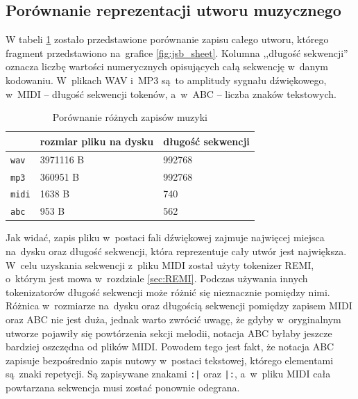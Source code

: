 \documentclass[data-science]{agh-wi} %
\begin{document}
\subsection{Porównanie reprezentacji utworu muzycznego}
W tabeli \ref*{tab:music_diff} zostało przedstawione porównanie zapisu całego utworu, którego fragment przedstawiono na~grafice \ref*{fig:jsb_sheet}. Kolumna ,,długość sekwencji'' oznacza liczbę wartości numerycznych opisujących całą sekwencję w~danym kodowaniu. W~plikach WAV i~MP3 są~to amplitudy sygnału dźwiękowego, w~MIDI -- długość sekwencji tokenów, a~w~ABC -- liczba znaków tekstowych.

\begin{table}[ht!]
    \centering
    \begin{tabular}{|l|l|l|}
        \hline
                      & rozmiar pliku na dysku & długość sekwencji \\ \hline
        \texttt{wav}  & 3971116 B              & 992768            \\ \hline
        \texttt{mp3}  & 360951 B               & 992768            \\ \hline
        \texttt{midi} & 1638 B                 & 740               \\ \hline
        \texttt{abc}  & 953 B                  & 562               \\ \hline
    \end{tabular}
    \caption{Porównanie różnych zapisów muzyki}\label{tab:music_diff}
\end{table}

Jak widać, zapis pliku w~postaci fali dźwiękowej zajmuje najwięcej miejsca na~dysku oraz długość sekwencji, która reprezentuje cały utwór jest największa. W~celu uzyskania sekwencji z~pliku MIDI został użyty tokenizer REMI, o~którym jest mowa w~rozdziale \ref*{sec:REMI}. Podczas używania innych tokenizatorów długość sekwencji może różnić się nieznacznie pomiędzy nimi. Różnica w~rozmiarze na~dysku oraz długością sekwencji pomiędzy zapisem MIDI oraz ABC nie jest duża, jednak warto zwrócić uwagę, że gdyby w~oryginalnym utworze pojawiły się powtórzenia sekcji melodii, notacja ABC byłaby jeszcze bardziej oszczędna od plików MIDI. Powodem tego jest fakt, że notacja ABC zapisuje bezpośrednio zapis nutowy w~postaci tekstowej, którego elementami są~znaki repetycji. Są zapisywane znakami \texttt{:|} oraz \texttt{|:}, a~w~pliku MIDI cała powtarzana sekwencja musi zostać ponownie odegrana.
\end{document}
